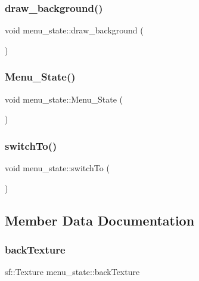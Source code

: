 \subsubsection{\texorpdfstring{draw\+\_\+background()}{draw\_background()}}
{\footnotesize\ttfamily void menu\+\_\+state\+::draw\+\_\+background (\begin{DoxyParamCaption}{ }\end{DoxyParamCaption})}

\hypertarget{classmenu__state_accc17a76d43d17d4807b8c759c435dcc}{}\label{classmenu__state_accc17a76d43d17d4807b8c759c435dcc} 
\subsubsection{\texorpdfstring{Menu\+\_\+\+State()}{Menu\_State()}}
{\footnotesize\ttfamily void menu\+\_\+state\+::\+Menu\+\_\+\+State (\begin{DoxyParamCaption}{ }\end{DoxyParamCaption})}

\hypertarget{classmenu__state_af66bfdf9a0a01567637af139fdc77f5a}{}\label{classmenu__state_af66bfdf9a0a01567637af139fdc77f5a} 
\subsubsection{\texorpdfstring{switch\+To()}{switchTo()}}
{\footnotesize\ttfamily void menu\+\_\+state\+::switch\+To (\begin{DoxyParamCaption}{ }\end{DoxyParamCaption})}



\subsection{Member Data Documentation}
\hypertarget{classmenu__state_a09398cebcf4c51159e5992f17d881fd7}{}\label{classmenu__state_a09398cebcf4c51159e5992f17d881fd7} 
\subsubsection{\texorpdfstring{back\+Texture}{backTexture}}
{\footnotesize\ttfamily sf\+::\+Texture menu\+\_\+state\+::back\+Texture}




